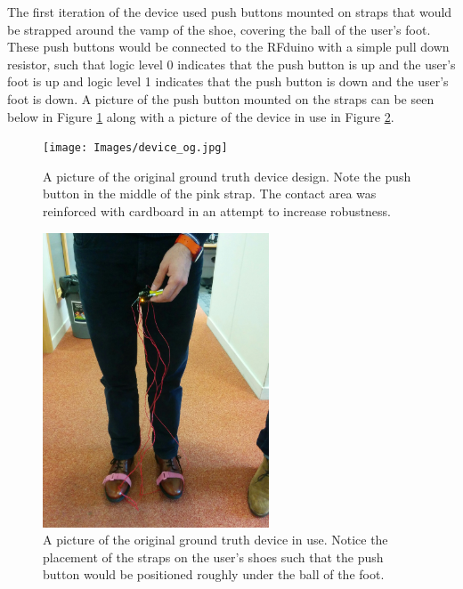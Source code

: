            The first iteration of the device used push buttons mounted on straps that would be strapped around the vamp of the shoe, covering the ball of the user's foot. These push buttons would be connected to the RFduino with a simple pull down resistor, such that logic level 0 indicates that the push button is up and the user's foot is up and logic level 1 indicates that the push button is down and the user's foot is down. A picture of the push button mounted on the straps can be seen below in Figure \ref{img_device_og} along with a picture of the device in use in Figure \ref{img_device_og_use}.

            \begin{figure}[!th]
                \texttt{[image: Images/device\_og.jpg]}
                \centering
                \caption{A picture of the original ground truth device design. Note the push button in the middle of the pink strap. The contact area was reinforced with cardboard in an attempt to increase robustness.}
                \label{img_device_og}
            \end{figure}

            \begin{figure}[!th]
                \includegraphics[width=0.6\textwidth]{Images/device_og_use.jpg}
                \centering
                \caption{A picture of the original ground truth device in use. Notice the placement of the straps on the user's shoes such that the push button would be positioned roughly under the ball of the foot.}
                \label{img_device_og_use}
            \end{figure}

